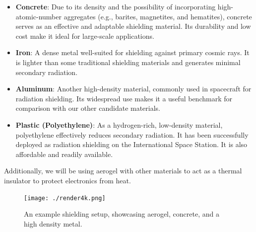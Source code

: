 \documentclass{article}
\begin{document}
\begin{itemize}
    \item \textbf{Concrete}: Due to its density and the possibility of incorporating high-atomic-number aggregates (e.g., barites, magnetites, and hematites), concrete serves as an effective and adaptable shielding material. Its durability and low cost make it ideal for large-scale applications. 

    \item \textbf{Iron}: A dense metal well-suited for shielding against primary cosmic rays. It is lighter than some traditional shielding materials and generates minimal secondary radiation.

    \item \textbf{Aluminum}: Another high-density material, commonly used in spacecraft for radiation shielding. Its widespread use makes it a useful benchmark for comparison with our other candidate materials.

    \item \textbf{Plastic (Polyethylene)}: As a hydrogen-rich, low-density material, polyethylene effectively reduces secondary radiation. It has been successfully deployed as radiation shielding on the International Space Station. It is also affordable and readily available.
\end{itemize}

Additionally, we will be using aerogel with other materials
to act as a thermal insulator to protect electronics from heat. 

\begin{figure}[H]
    \centering
    \texttt{[image: ./render4k.png]}
    \caption{An example shielding setup, showcasing aerogel, concrete, and a high density metal.}
    \label{fig: multi-shielding}
\end{figure}


\newpage
\vspace*{-5.5em}
\end{document}
